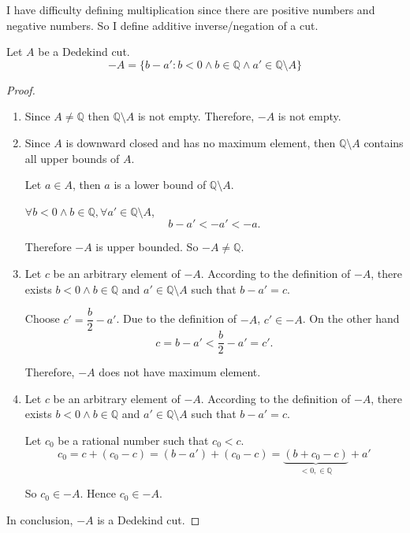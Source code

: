 \documentclass[class=mike-apostol-mathematical-analysis,crop=false]{standalone}
\begin{document}
\par I have difficulty defining multiplication since there are positive numbers and negative numbers. So I define additive inverse/negation of a cut.

\begin{definition}
    \par Let $ A$ be a Dedekind cut.
    \[
        - A = \{ b - a' : b < 0 \wedge b\in\mathbb{Q} \wedge a'\in\mathbb{Q}\setminus A \}
    \]
\end{definition}

\begin{proof}
    \begin{enumerate}[label = (\roman*)]
        \item Since $ A\ne\mathbb{Q}$ then $\mathbb{Q}\setminus A$ is not empty. Therefore, $- A$ is not empty.
        \item Since $ A$ is downward closed and has no maximum element, then $\mathbb{Q}\setminus A$ contains all upper bounds of $ A$.
              \par Let $a\in A$, then $a$ is a lower bound of $\mathbb{Q}\setminus A$.
              \par $\forall b < 0 \wedge b\in\mathbb{Q}, \forall a'\in\mathbb{Q}\setminus A$,
              \[
                  b - a' < -a' < -a.
              \]
              \par Therefore $- A$ is upper bounded. So $- A\ne\mathbb{Q}$.
        \item Let $c$ be an arbitrary element of $- A$. According to the definition of $- A$, there exists $b < 0\wedge b\in\mathbb{Q}$ and $a'\in\mathbb{Q}\setminus A$ such that $b - a' = c$.
              \par Choose $c' = \dfrac{b}{2} - a'$. Due to the definition of $- A$, $c'\in - A$. On the other hand
              \[
                  c = b - a' < \dfrac{b}{2} - a' = c'.
              \]
              \par Therefore, $- A$ does not have maximum element.
        \item Let $c$ be an arbitrary element of $- A$. According to the definition of $- A$, there exists $b < 0\wedge b\in\mathbb{Q}$ and $a'\in\mathbb{Q}\setminus A$ such that $b - a' = c$.
              \par Let $c_{0}$ be a rational number such that $c_{0} < c$.
              \[
                  c_{0} = c + (c_{0} - c) = (b - a') + (c_{0} - c) = \underbrace{(b + c_{0} - c)}_{< 0, \in\mathbb{Q}} + a'
              \]
              \par So $c_{0}\in - A$. Hence $c_{0}\in - A$.
    \end{enumerate}
    \par In conclusion, $- A$ is a Dedekind cut.
\end{proof}
\end{document}
